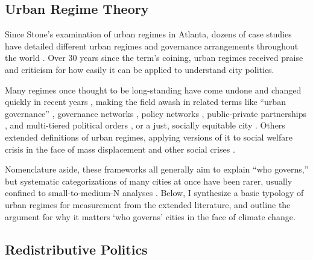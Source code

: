 \documentclass[preprint, 3p,
authoryear]{elsarticle} %
\begin{document}
\hypertarget{urban-regime-theory}{%
\subsection{Urban Regime Theory}\label{urban-regime-theory}}

Since Stone's \citeyearpar{stone_1989} examination of urban regimes in
Atlanta, dozens of case studies have detailed different urban regimes
and governance arrangements throughout the world
\citep{stoker_and_mossberger_1994, mossberger_and_stoker_2001, de_socio_2007, camou_2014, davies_and_blanco_2017, rosol_et_al_2017, russo_and_scarnato_2018}.
Over 30 years since the term's coining, urban regimes received praise
\citep{kilburn_2004, davies_and_imbroscio_2009} and criticism
\citep{sites_1997, davies_2003, imbroscio_2003, imbroscio_2004} for how
easily it can be applied to understand city politics.

Many regimes once thought to be long-standing have come undone and
changed quickly in recent years \citep{stone_2015, stone_et_al_2015},
making the field awash in related terms like ``urban governance''
\citep{pierre_2014, da_cruz_et_al_2019}, governance networks
\citep{gissendanner_2003, davidson_et_al_2019}, policy networks
\citep{bulkeley_and_betsill_2013, hawkins_et_al_2016, wukich_2022},
public-private partnerships
\citep{stoker_1998, davies_2017, guo_and_ho_2019}, and multi-tiered
political orders \citep{stone_2015, weaver_2022}, or a just, socially
equitable city \citep{campbell_1996, fainstein_2010}. Others extended
definitions of urban regimes, applying versions of it to social welfare
crisis in the face of mass displacement and other social crises
\citep{lambelet_2019}.

Nomenclature aside, these frameworks all generally aim to explain ``who
governs,'' but systematic categorizations of many cities at once have
been rarer, usually confined to small-to-medium-N analyses
\citep{sellers_2002, kilburn_2004, stone_et_al_2015, davies_and_blanco_2017}.
Below, I synthesize a basic typology of urban regimes for measurement
from the extended literature, and outline the argument for why it
matters `who governs' cities in the face of climate change.

\hypertarget{redistributive-politics}{%
\subsection{Redistributive Politics}\label{redistributive-politics}}
\end{document}
